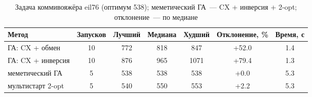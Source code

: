 \begin{table}[H]
\caption{Задача коммивояжёра eil76 (оптимум 538); меметический ГА~--- CX + инверсия + 2-opt; отклонение~--- по медиане}
\label{tab:tsp}
\centering
\small
\begin{tabular}{lcccccc}
\toprule
Метод & Запусков & Лучший & Медиана & Худший & Отклонение, \% & Время, с \\
\midrule
ГА: CX + обмен & 10 & 772 & 818 & 847 & +52.0 & 1.4 \\
ГА: CX + инверсия & 10 & 876 & 965 & 1071 & +79.4 & 1.3 \\
меметический ГА & 5 & 538 & 538 & 538 & +0.0 & 5.3 \\
мультистарт 2-opt & 5 & 540 & 550 & 553 & +2.2 & 5.3 \\
\bottomrule
\end{tabular}
\end{table}
